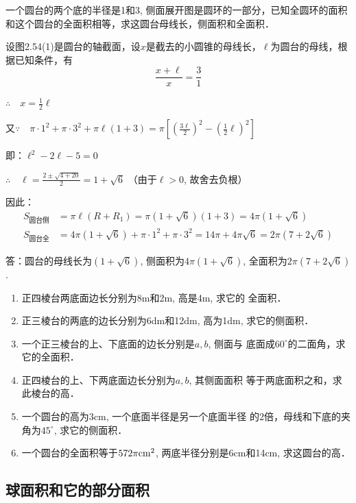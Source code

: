 \begin{example}
    一个圆台的两个底的半径是1和3, 侧面展开图是圆环的一部分，已知全圆环的面积和这个圆台的全面积相等，求这圆台母线长，侧面积和全面积．
\end{example}


\begin{solution}
设图2.54(1)是圆台的轴截面，设$x$是截去的小圆锥的母线长，$\ell$为圆台的母线，根据已知条件，有
\[\frac{x+\ell}{x}=\frac{3}{1}\]

$\therefore\quad x=\frac{1}{2}\ell$

又$\because\quad \pi\cdot 1^2+\pi\cdot 3^2+\pi\ell(1+3)=\pi\left[\left(\frac{3\ell}{2}\right)^2-\left(\frac{1}{2}\ell\right)^2\right]$

即：$\ell^2-2\ell-5=0$

$\therefore\quad \ell=\frac{2\pm\sqrt{4+20}}{2}=1+\sqrt{6}$ （由于$\ell>0$, 故舍去负根）

因此：
\[\begin{split}
S_{\text{圆台侧}}&=\pi \ell(R+R_1)=\pi  (1+\sqrt{6}) (1+3)=4\pi  (1+\sqrt{6})\\
S_{\text{圆台全}} &=4\pi (1+\sqrt{6})+\pi \cdot 1^2+\pi \cdot 3^2
=14\pi +4\pi \sqrt{6}=2\pi  (7+2\sqrt{6})
\end{split}\]

答：圆台的母线长为$(1+\sqrt{6})$, 侧面积为$4\pi(1+\sqrt{6})$, 全面积为$2\pi (7+2\sqrt{6})$.
\end{solution}

\begin{ex}
\begin{enumerate}
    \item 正四棱台两底面边长分别为8m和2m, 高是4m, 求它的
    全面积．
    \item 正三棱台的两底的边长分别为6dm和12dm, 高为1dm,
    求它的侧面积．
    \item 一个正三棱台的上、下底面的边长分别是$a,b$, 侧面与
    底面成$60^{\circ}$的二面角，求它的全面积．
    \item 正四棱台的上、下两底面边长分别为$a,b$, 其侧面面积
    等于两底面积之和，求此棱台的高．
    \item 一个圆台的高为3cm, 一个底面半径是另一个底面半径
    的2倍，母线和下底的夹角为$45^{\circ}$, 求它的侧面积．
    \item 一个圆台的全面积等于$572\pi{\rm cm^2}$, 两底半径分别是6cm和14cm, 求这圆台的高．
\end{enumerate}
\end{ex}

\subsection{球面积和它的部分面积}

